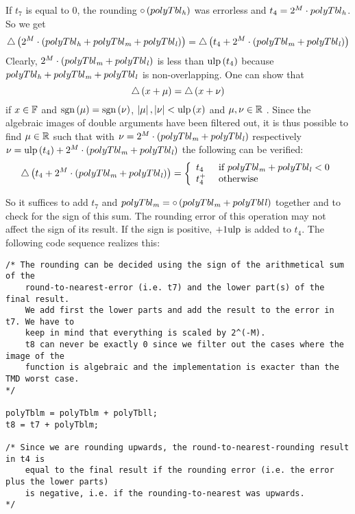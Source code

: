 \begin{itemize}
If $t_7$ is equal to $0$, the rounding $\circ\left( polyTbl_{\mathit{h}}
\right)$ was errorless and $t_4 = 2^M \cdot polyTbl_{\mathit{h}}$. So we get
$$\bigtriangleup\left( 2^M \cdot \left( polyTbl_{\mathit{h}} + polyTbl_{\mathit{m}} +
polyTbl_{\mathit{l}} \right) \right) = \bigtriangleup\left( t_4 + 2^M \cdot \left(
polyTbl_{\mathit{m}} + polyTbl_{\mathit{l}} \right) \right)$$ Clearly, $2^M \cdot \left(
polyTbl_{\mathit{m}} + polyTbl_{\mathit{l}} \right)$ is less than $\mathrm{ulp}\left( t_4
\right)$ because $polyTbl_{\mathit{h}} + polyTbl_{\mathit{m}} + polyTbl_{\mathit{l}}$ is
non-overlapping. One can show that
$$\bigtriangleup\left( x + \mu \right) = \bigtriangleup\left( x + \nu \right)$$ if
$x \in \mathbb {F}$ and $\mathrm{sgn}\left( \mu \right) = \mathrm{sgn}\left( \nu \right)$,
$\left \vert \mu \right \vert, \left \vert \nu \right \vert <
\mathrm{ulp}\left( x \right)$ and $\mu, \nu \in \mathbb {R}$
\cite{Lauter2005LIP:tripledouble}.  Since the algebraic images of double
arguments have been filtered out, it is thus possible to find $\mu \in \mathbb {R}$ such that
with $\nu = 2^M \cdot \left( polyTbl_{\mathit{m}} + polyTbl_{\mathit{l}} \right)$ respectively 
$\nu = \mathrm{ulp}\left(t_4\right) + 2^M \cdot \left( polyTbl_{\mathit{m}} + polyTbl_{\mathit{l}} \right)$
the following can be verified:
$$\bigtriangleup \left( t_4 + 2^M \cdot \left( polyTbl_{\mathit{m}} + polyTbl_{\mathit{l}}
\right) \right) = \left \lbrace \begin{array}{ll} t_4 & \mbox{ if }
polyTbl_{\mathit{m}} + polyTbl_{\mathit{l}} < 0 \\ t_4^+ & \mbox{ otherwise} \end{array}
\right.$$

So it suffices to add $t_7$ and $polyTbl_{\mathit{m}} = \circ\left(
polyTbl_{\mathit{m}} + polyTbl\mathit{l} \right)$ together and to check for the sign
of this sum. The rounding error of this operation may not affect the
sign of its result. If the sign is positive, $+1 \mathrm{ulp}$ is added 
to $t_4$. The following code sequence realizes this:
\begin{lstlisting}[caption={Rounding adjustment in round-upwards},firstnumber=1]
/* The rounding can be decided using the sign of the arithmetical sum of the
	round-to-nearest-error (i.e. t7) and the lower part(s) of the final result.
	We add first the lower parts and add the result to the error in t7. We have to 
	keep in mind that everything is scaled by 2^(-M).
	t8 can never be exactly 0 since we filter out the cases where the image of the 
	function is algebraic and the implementation is exacter than the TMD worst case.
*/

polyTblm = polyTblm + polyTbll;
t8 = t7 + polyTblm;

/* Since we are rounding upwards, the round-to-nearest-rounding result in t4 is 
	equal to the final result if the rounding error (i.e. the error plus the lower parts)
	is negative, i.e. if the rounding-to-nearest was upwards.
*/


\end{lstlisting}
\end{itemize}
